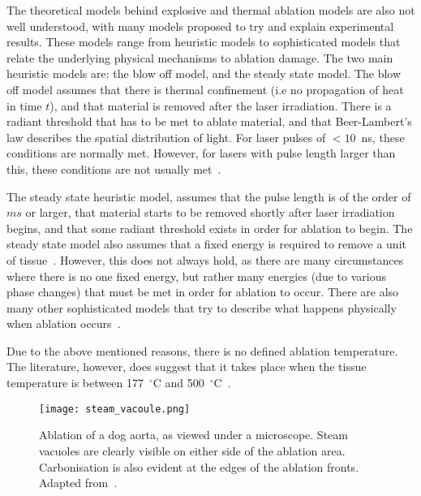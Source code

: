 The theoretical models behind explosive and thermal ablation models are also not well understood, with many models proposed to try and explain experimental results. These models range from heuristic models to sophisticated models that relate the underlying physical mechanisms to ablation damage. 
The two main heuristic models are: the blow off model, and the steady state model. 
The blow off model assumes that there is thermal confinement (i.e no propagation of heat in time $t$), and that material is removed after the laser irradiation. There is a radiant threshold that has to be met to ablate material, and that Beer-Lambert's law describes the spatial distribution of light. For laser pulses of $<10$~ns, these conditions are normally met. However, for lasers with pulse length larger than this, these conditions are not usually met~\cite{vogel2003mechanisms,koren1984emission,andrew1983direct}. 

The steady state heuristic model, assumes that the pulse length is of the order of $ms$ or larger, that material starts to be removed shortly after laser irradiation begins, and that some radiant threshold exists in order for ablation to begin. The steady state model also assumes that a fixed energy is required to remove a unit of tissue~\cite{vogel2003mechanisms}. However, this does not always hold, as there are many circumstances where there is no one fixed energy, but rather many energies (due to various phase changes) that must be met in order for ablation to occur. There are also many other sophisticated models that try to describe what happens physically when ablation occurs~\cite{mckenzie1990physics,mckenzie1986three,majaron1999thermo}.

Due to the above mentioned reasons, there is no defined ablation temperature. The literature, however, does suggest that it takes place when the tissue temperature is between 177~${^{\circ}}$C and 500~${^{\circ}}$C~\cite{gerstmann1994char,mckenzie1986three,sagi1992heating}. 

\begin{figure}	
\vspace{-10pt}
	\centering
	\texttt{[image: steam\_vacoule.png]}
	\caption{Ablation of a dog aorta, as viewed under a microscope. Steam vacuoles are clearly visible on either side of the ablation area. Carbonisation is also evident at the edges of the ablation fronts. Adapted from~\cite{welch2011optical}.}
	\label{fig:histology}
	\vspace{-10pt}
\end{figure}

